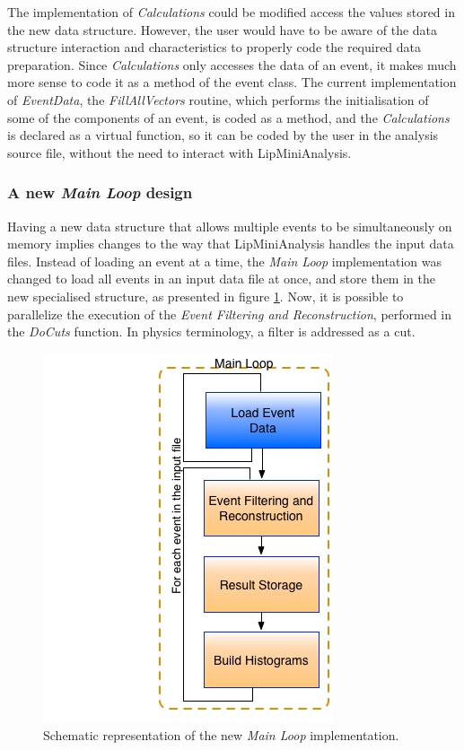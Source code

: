 The implementation of \textit{Calculations} could be modified access the values stored in the new data structure. However, the user would have to be aware of the data structure interaction and characteristics to properly code the required data preparation. Since \textit{Calculations} only accesses the data of an event, it makes much more sense to code it as a method of the event class. The current implementation of \textit{EventData}, the \textit{FillAllVectors} routine, which performs the initialisation of some of the components of an event, is coded as a method, and the \textit{Calculations} is declared as a virtual function, so it can be coded by the user in the analysis source file, without the need to interact with LipMiniAnalysis.

\subsubsection*{A new \textit{Main Loop} design}

Having a new data structure that allows multiple events to be simultaneously on memory implies changes to the way that LipMiniAnalysis handles the input data files. Instead of loading an event at a time, the \textit{Main Loop} implementation was changed to load all events in an input data file at once, and store them in the new specialised structure, as presented in figure \ref{fig:new_loop}. Now, it is possible to parallelize the execution of the \textit{Event Filtering and Reconstruction}, performed in the \textit{DoCuts} function. In physics terminology, a filter is addressed as a cut.

\begin{figure}[!htp]
	\begin{center}
		\includegraphics[scale=0.5]{imgs/new_loop.png}
		\caption{Schematic representation of the new \textit{Main Loop} implementation.}
		\label{fig:new_loop}
	\end{center}
\end{figure}


